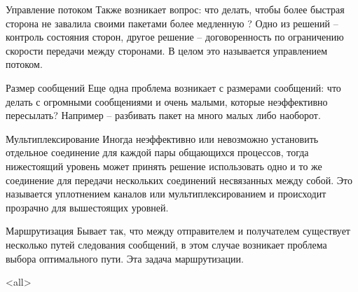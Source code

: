 \begin{frame}{Управление потоком}
	Также возникает вопрос: что делать,  чтобы более быстрая сторона не завалила своими пакетами более медленную ? Одно из решений – контроль состояния сторон,  другое решение – договоренность по ограничению скорости передачи между сторонами. В целом это называется управлением потоком.
\end{frame}

\begin{frame}{Размер сообщений}
Еще одна проблема возникает с размерами сообщений: что делать с огромными сообщениями и очень малыми,  которые неэффективно пересылать?
Например -- разбивать пакет на много малых либо наоборот.
\end{frame}

\begin{frame}{Мультиплексирование}
	Иногда неэффективно или невозможно установить отдельное соединение для каждой пары общающихся процессов,  тогда нижестоящий уровень может принять решение использовать одно и то же соединение для передачи нескольких соединений несвязанных между собой. Это называется уплотнением каналов или мультиплексированием и происходит прозрачно для вышестоящих уровней.
\end{frame}

\begin{frame}{Маршрутизация}
	Бывает так,  что между отправителем и получателем существует несколько путей следования сообщений,  в этом случае возникает проблема выбора оптимального пути. Эта задача маршрутизации.
\end{frame}

\mode<all>{}


